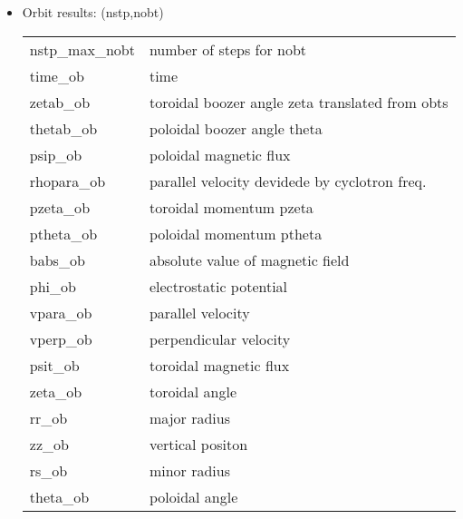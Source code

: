 \documentclass[11pt]{article}
\begin{document}
\begin{itemize}
\item
  Orbit results: (nstp,nobt)
  \begin{center}
    \begin{tabular}{ll}
       nstp\_max\_nobt & number of steps for nobt \\
       time\_ob       & time \\
       zetab\_ob      & toroidal boozer angle zeta translated from obts \\
       thetab\_ob     & poloidal boozer angle theta \\
       psip\_ob       & poloidal magnetic flux \\
       rhopara\_ob    & parallel velocity devidede by cyclotron freq. \\
       pzeta\_ob      & toroidal momentum pzeta \\
       ptheta\_ob     & poloidal momentum ptheta \\
       babs\_ob       & absolute value of magnetic field \\
       phi\_ob        & electrostatic potential \\
       vpara\_ob      & parallel velocity \\
       vperp\_ob      & perpendicular velocity \\
       psit\_ob       & toroidal magnetic flux \\
       zeta\_ob       & toroidal angle \\
       rr\_ob         & major radius \\
       zz\_ob         & vertical positon \\
       rs\_ob         & minor radius \\
       theta\_ob      & poloidal angle
    \end{tabular}
  \end{center}
\end{itemize}
\end{document}
